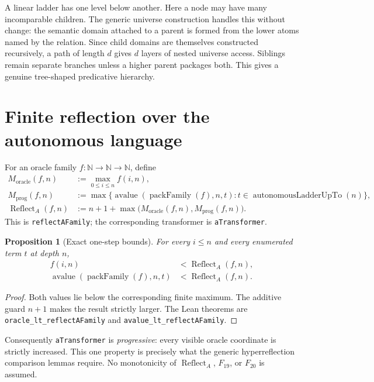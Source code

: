 \documentclass[11pt]{article}
\newtheorem{proposition}[theorem]{Proposition}
\theoremstyle{definition}
\theoremstyle{remark}
\newcommand{\reflectA}{\operatorname{Reflect}_{A}}
\begin{document}
A linear ladder has one level below another.  Here a node may have many
incomparable children.  The generic universe construction handles this
without change: the semantic domain attached to a parent is formed from the
lower atoms named by the relation.  Since child domains are themselves
constructed recursively, a path of length $d$ gives $d$ layers of nested
universe access.  Siblings remain separate branches unless a higher parent
packages both.  This gives a genuine tree-shaped predicative hierarchy.

\section{Finite reflection over the autonomous language}
\label{sec:reflection}

For an oracle family $f:\mathbb N\to\mathbb N\to\mathbb N$, define
\begin{align*}
 M_{\mathrm{oracle}}(f,n)
   &:= \max_{0\leq i\leq n} f(i,n),\\
 M_{\mathrm{prog}}(f,n)
   &:= \max\{\operatorname{avalue}(\operatorname{packFamily}(f),n,t):
            t\in\operatorname{autonomousLadderUpTo}(n)\},\\
 \reflectA(f,n)
   &:= n+1+\max\bigl(M_{\mathrm{oracle}}(f,n),
                     M_{\mathrm{prog}}(f,n)\bigr).
\end{align*}
This is \texttt{reflectAFamily}; the corresponding transformer is
\texttt{aTransformer}.

\begin{proposition}[Exact one-step bounds]
For every $i\leq n$ and every enumerated term $t$ at depth $n$,
\begin{align*}
  f(i,n) &< \reflectA(f,n),\\
  \operatorname{avalue}(\operatorname{packFamily}(f),n,t)
    &< \reflectA(f,n).
\end{align*}
\end{proposition}

\begin{proof}
Both values lie below the corresponding finite maximum.  The additive guard
$n+1$ makes the result strictly larger.  The Lean theorems are
\nolinkurl{oracle_lt_reflectAFamily} and
\nolinkurl{avalue_lt_reflectAFamily}.
\end{proof}

Consequently \texttt{aTransformer} is \emph{progressive}: every visible
oracle coordinate is strictly increased.  This one property is precisely what
the generic hyperreflection comparison lemmas require.  No monotonicity of
$\reflectA$, $F_{19}$, or $F_{20}$ is assumed.
\end{document}
